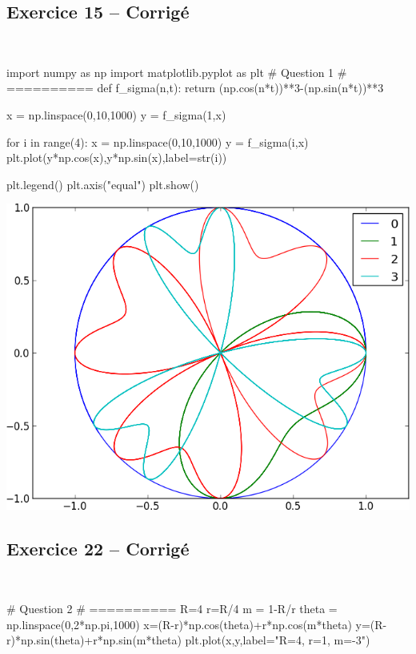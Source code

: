 \documentclass[10pt,fleqn]{article} %
\begin{document}
\begin{multicols}{2}
\columnbreak
{}
\subsection*{Exercice 15 -- Corrigé}

\begin{corrige}
$\quad$
\begin{python}
import numpy as np
import matplotlib.pyplot as plt
# Question 1 
# ==========
def f_sigma(n,t):
    return (np.cos(n*t))**3-(np.sin(n*t))**3

x = np.linspace(0,10,1000)
y = f_sigma(1,x)

for i in range(4):
    x = np.linspace(0,10,1000)
    y = f_sigma(i,x)
    plt.plot(y*np.cos(x),y*np.sin(x),label=str(i))

plt.legend()
plt.axis("equal")    
plt.show()
\end{python}
\end{corrige}
\begin{center}
\includegraphics[width=.9\linewidth]{images/exo_15}
\end{center}




\columnbreak
{}
\subsection*{Exercice 22 -- Corrigé}

\begin{corrige}
$\quad$
\begin{python}
# Question 2
# ==========
R=4
r=R/4
m = 1-R/r
theta = np.linspace(0,2*np.pi,1000)
x=(R-r)*np.cos(theta)+r*np.cos(m*theta)
y=(R-r)*np.sin(theta)+r*np.sin(m*theta)
plt.plot(x,y,label="R=4, r=1, m=-3")
\end{python}
\end{corrige}


\end{multicols}
\end{document}
